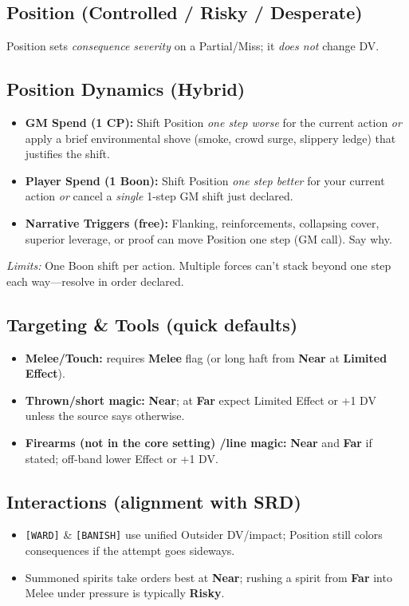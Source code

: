 \documentclass[11pt]{article}
\begin{document}
\subsection*{Position (Controlled / Risky / Desperate)}
Position sets \emph{consequence severity} on a Partial/Miss; it \emph{does not} change DV.

\subsection*{Position Dynamics (Hybrid)}
\begin{itemize}
  \item \textbf{GM Spend (1 CP):} Shift Position \emph{one step worse} for the current action \emph{or} apply a brief environmental shove (smoke, crowd surge, slippery ledge) that justifies the shift.
  \item \textbf{Player Spend (1 Boon):} Shift Position \emph{one step better} for your current action \emph{or} cancel a \emph{single} 1-step GM shift just declared.
  \item \textbf{Narrative Triggers (free):} Flanking, reinforcements, collapsing cover, superior leverage, or proof can move Position one step (GM call). Say why.
\end{itemize}
\emph{Limits:} One Boon shift per action. Multiple forces can't stack beyond one step each way—resolve in order declared.

\subsection*{Targeting \& Tools (quick defaults)}
\begin{itemize}
  \item \textbf{Melee/Touch:} requires \textbf{Melee} flag (or long haft from \textbf{Near} at \textbf{Limited Effect}).
  \item \textbf{Thrown/short magic:} \textbf{Near}; at \textbf{Far} expect Limited Effect or +1 DV unless the source says otherwise.
  \item \textbf{Firearms (not in the core setting) /line magic:} \textbf{Near} and \textbf{Far} if stated; off-band \Rightarrow lower Effect or +1 DV.
\end{itemize}

\subsection*{Interactions (alignment with SRD)}
\begin{itemize}
  \item \texttt{[WARD]} \& \texttt{[BANISH]} use unified Outsider DV/impact; Position still colors consequences if the attempt goes sideways.
  \item Summoned spirits take orders best at \textbf{Near}; rushing a spirit from \textbf{Far} into Melee under pressure is typically \textbf{Risky}.
\end{itemize}
\end{document}
